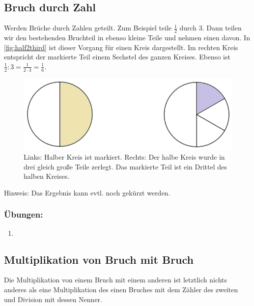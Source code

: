 \subsection{Bruch durch Zahl}\vspace{-1em}
Werden Brüche durch Zahlen geteilt. Zum Beispiel teile $\frac{1}{2}$ durch $3$. Dann teilen wir den bestehenden Bruchteil in ebenso kleine Teile und nehmen einen davon. In \autoref{fig:half2third} ist dieser Vorgang für einen Kreis dargestellt. Im rechten Kreis entspricht der markierte Teil einem Sechstel des ganzen Kreises. Ebenso ist $\frac{1}{2}:3=\frac{1}{2\cdot 3}=\frac{1}{6}$.

\begin{figure}
	\centering
	\includegraphics[width=0.7\linewidth]{fig/half2third}
	\caption[Halbes zu Drittel]{Links: Halber Kreis ist markiert. Rechts: Der halbe Kreis wurde in drei gleich große Teile zerlegt. Das markierte Teil ist ein Drittel des halben Kreises.}
	\label{fig:half2third}
\end{figure}


Hinweis: Das Ergebnis kann evtl. noch gekürzt werden.

\subsubsection*{Übungen:}\vspace{-1em}
\begin{enumerate}[label=\alph*)]
	\item {}
\end{enumerate}

\subsection{Multiplikation von Bruch mit Bruch}
Die Multiplikation von einem Bruch mit einem anderen ist letztlich nichts anderes als eine Multiplikation des einen Bruches mit dem Zähler des zweiten und Division mit dessen Nenner. 

